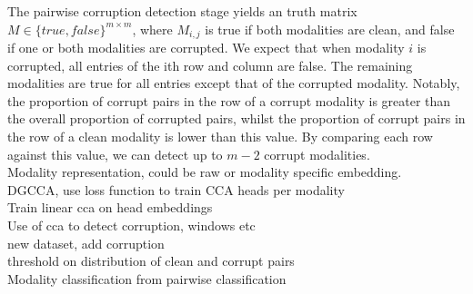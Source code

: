 
The pairwise corruption detection stage yields an truth matrix $M \in \{true, false\}^{m\times m}$, where $M_{i,j}$ is true if both modalities are clean, and false if one or both modalities are corrupted. We expect that when modality $i$ is corrupted, all entries of the ith row and column are false. The remaining modalities are true for all entries except that of the corrupted modality. Notably, the proportion of corrupt pairs in the row of a corrupt modality is greater than the overall proportion of corrupted pairs, whilst the proportion of corrupt pairs in the row of a clean modality is lower than this value. By comparing each row against this value, we can detect up to $m-2$ corrupt modalities.\\

Modality representation, could be raw or modality specific embedding.\\

DGCCA, use loss function to train CCA heads per modality\\

Train linear cca on head embeddings\\

Use of cca to detect corruption, windows etc\\

new dataset, add corruption\\

threshold on distribution of clean and corrupt pairs\\

Modality classification from pairwise classification\\
